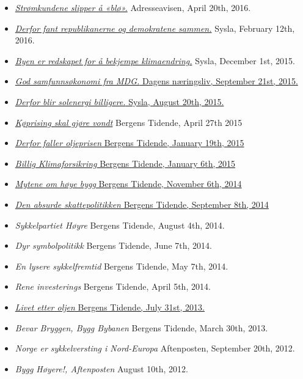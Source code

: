 \documentclass[margin]{res}
\begin{document}
\begin{itemize}
\item[] \href{http://www.e-pages.dk/adresseavisen/5117/article/411985/41/6/render/?token=21b06b63e6a1cbd3e62966cf5706d3ab}{\emph{Str\o mkundene slipper \r{a} «bl\o».}} Adresseavisen, April 20th, 2016.
\item[] \href{http://syslagronn.no/2016/02/12/syslagronn/derfor-fant-republikanerne-og-demokratene-sammen_76977/}{\emph{Derfor fant republikanerne og demokratene sammen.}} Sysla, February 12th, 2016.
\item[] \href{http://www.syslagronn.no/2015/12/01/syslagronn/byen-er-redskapet-for-a-bekjempe-klimaendringer_67934/}{\emph{Byen er redskapet for å bekjempe klimaendring.}} Sysla, December 1st, 2015.
\item[] \href{http://www.dn.no/meninger/2015/09/20/2043/Politikk/god-samfunnskonomi-fra-mdg}{\emph{God samfunnsøkonomi fra MDG.} Dagens n\ae ringsliv, September 21st, 2015.}
\item[] \href{http://www.syslagronn.no/2015/08/20/syslagronn/derfor-blir-solenergi-billigere_51484/}{\emph{Derfor blir solenergi billigere.} Sysla, August 20th, 2015.}
\item[] \href{http://www.e-pages.dk/bergenstidende/1809/article/264899/28/2/render/?token=02cd272aa0579373983f0bf8c4cee611}{ \emph{K\o prising skal gjøre vondt}} Bergens Tidende, April 27th 2015
\item[] \href{http://www.bt.no/meninger/debatt/Derfor-faller-oljeprisen-3282375.html}{ \emph {Derfor faller oljeprisen} Bergens Tidende, January 19th, 2015}
\item[] \href{http://www.e-pages.dk/bergenstidende/1700/article/227941/31/4/render/?token=5207fb9bf5f917b5276532ef05164266}{ \emph {Billig Klimaforsikring} Bergens Tidende, January 6th, 2015}
\item[] \href{http://www.bt.no/meninger/debatt/Mytene-om-hoye-bygg-3234980.html}{ \emph {Mytene om h\o ye bygg} Bergens Tidende, November 6th, 2014}
\item[] \href{http://www.bt.no/meninger/debatt/Den-absurde-skattepolitikken-3191273.html}{\emph{Den absurde skattepolitikken} Bergens Tidende, September 8th, 2014}
\item[] \emph {Sykkelpartiet H\o yre}  Bergens Tidende, August 4th, 2014.
\item[] \emph {Dyr symbolpolitikk}  Bergens Tidende, June 7th, 2014.
\item[] \emph {En lysere sykkelfremtid}  Bergens Tidende, May 7th, 2014.
\item[] \emph {Rene investerings}  Bergens Tidende, April 5th, 2014.
\item[] \href{http://www.nhh.no/Files/Filer/institutter/for/bedriftsøkonomisk_debatt/2013/mauritzen-livet_etter_oljen-bt-310713.pdf}{\emph {Livet etter oljen}  Bergens Tidende, July 31st, 2013.}
\item[] \emph {Bevar Bryggen, Bygg Bybanen}  Bergens Tidende, March 30th, 2013.
\item[] \emph {Norge er sykkelversting i Nord-Europa} Aftenposten, September 20th, 2012.
\item[] \emph {Bygg H\o yere!, Aftenposten} August 10th, 2012.
\end{itemize}
\end{document}
